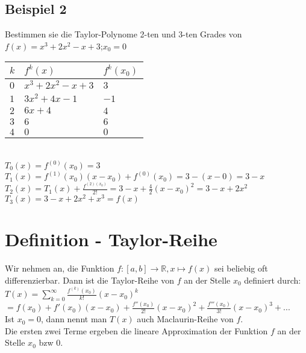 \documentclass[../main.tex]{subfiles}
\begin{document}
\subsection{Beispiel 2}
Bestimmen sie die Taylor-Polynome 2-ten und 3-ten Grades von $f(x)=x^3+2x^2-x+3$;$x_0=0$ \\
\begin{tabularx}{0.8\textwidth} { 
    >{\centering\arraybackslash}X
    >{\centering\arraybackslash}X 
    >{\centering\arraybackslash}X  }
    $k$ & $f^k(x)$ & $f^k(x_0)$
    \\ [7pt]
    \hline
    $0$ & $x^3+2x^2-x+3$ & $3$
    \\ [7pt]
    $1$ & $3x^2+4x-1$ & $-1$
    \\ [7pt]
    $2$ & $6x+4$ & $4$
    \\ [7pt]
    $3$ & $6$ & $6$
    \\ [7pt]
    $4$ & $0$ & $0$
    \\ [7pt]
\end{tabularx}
\\
$T_0(x)=f^{(0)}(x_0)=3$ \\ [7pt]
$T_1(x)=f^{(1)}(x_0)(x-x_0)+f^{(0)}(x_0)=3-(x-0)=3-x$ \\ [7pt]
$T_2(x)=T_1(x)+\frac{f^{(2)(x_0)}}{2!} = 3-x+\frac{4}{2}(x-x_0)^2=3-x+2x^2$ \\ [7pt]
$T_3(x)=3-x+2x^2+x^3 = f(x)$


\section{Definition - Taylor-Reihe}
Wir nehmen an, die Funktion $f:[a,b]\to\mathbb{R},x\mapsto f(x)$ sei beliebig oft differenzierbar.
Dann ist die Taylor-Reihe von $f$ an der Stelle $x_0$ definiert durch: \\ [7pt]
$T(x)=\sum\limits_{k=0}^\infty\frac{f^{(k)}(x_0)}{k!}(x-x_0)^k$
$=f(x_0)+f'(x_0)(x-x_0)+\frac{f''(x_0)}{2!}(x-x_0)^2+\frac{f'''(x_0)}{3!}(x-x_0)^3+... $ \\ [7pt]
Ist $x_0=0$, dann nennt man $T(x)$ auch Maclaurin-Reihe von $f$. \\
Die ersten zwei Terme ergeben die lineare Approximation der Funktion $f$ an der Stelle $x_0$ bzw $0$.
\end{document}
